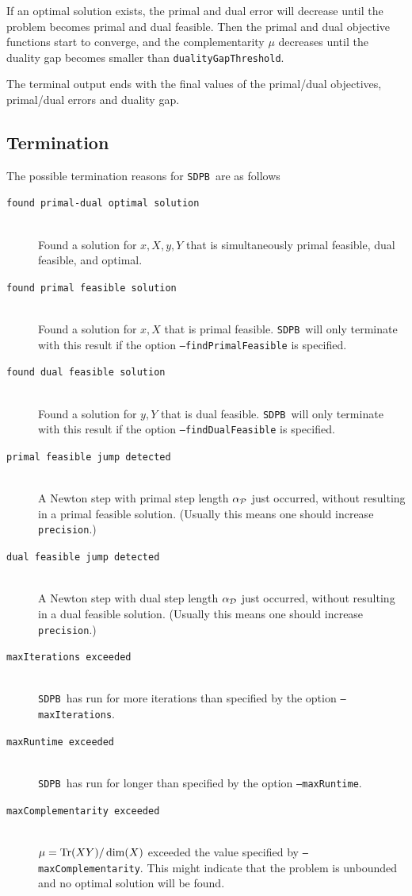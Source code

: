 \documentclass[12pt]{article}
\numberwithin{equation}{section}
\newcommand\SDPB{\texttt{SDPB}}
\begin{document}
If an optimal solution exists, the primal and dual error will decrease until the problem becomes primal and dual feasible.  Then the primal and dual objective functions start to converge, and the complementarity $\mu$ decreases until the duality gap becomes smaller than \texttt{dualityGapThreshold}.

The terminal output ends with the final values of the primal/dual objectives, primal/dual errors and duality gap.

\subsection{Termination}

The possible termination reasons for \SDPB\ are as follows
\begin{description}
\item[\texttt{found primal-dual optimal solution}] \hfill\\
Found a solution for $x,X,y,Y$ that is simultaneously primal feasible, dual feasible, and optimal.
\item[\texttt{found primal feasible solution}] \hfill\\
Found a solution for $x,X$ that is primal feasible.  \SDPB\ will only terminate with this result if the option \texttt{--findPrimalFeasible} is specified.
\item[\texttt{found dual feasible solution}] \hfill\\
Found a solution for $y,Y$ that is dual feasible.  \SDPB\ will only terminate with this result if the option \texttt{--findDualFeasible} is specified.
\item[\texttt{primal feasible jump detected}] \hfill\\
A Newton step with primal step length $\alpha_{\mathcal{P}}$ just occurred, without resulting in a primal feasible solution.  (Usually this means one should increase \texttt{precision}.)
\item[\texttt{dual feasible jump detected}] \hfill\\
A Newton step with dual step length $\alpha_{\mathcal{D}}$ just occurred, without resulting in a dual feasible solution.  (Usually this means one should increase \texttt{precision}.)
\item[\texttt{maxIterations exceeded}] \hfill\\
\SDPB\ has run for more iterations than specified by the option \texttt{--maxIterations}.
\item[\texttt{maxRuntime exceeded}] \hfill\\
\SDPB\ has run for longer than specified by the option \texttt{--maxRuntime}.
\item[\texttt{maxComplementarity exceeded}] \hfill\\
$\mu=\mathrm{Tr}(XY)/\dim(X)$ exceeded the value specified by \texttt{--maxComplementarity}.  This might indicate that the problem is unbounded and no optimal solution will be found.
\end{description}
\end{document}
